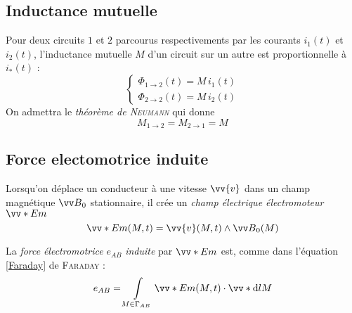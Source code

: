 \documentclass[11pt,a4paper,fleqn,pdftex]{report}
\begin{document}
\subsection{Inductance mutuelle} %
\label{sub:inductance_mutuelle}
\begin{itheorem}
  Pour deux circuits $1$ et $2$ parcourus respectivements par les courants $i_1(t)$ et $i_2(t)$, l'inductance mutuelle $M$ d'un circuit sur un autre est proportionnelle à $i_*(t)$ :
  \begin{equation}
  \left\lbrace
  \begin{gathered}
    \Phi_{1\to 2}(t) = M \,i_1(t)\\
    \Phi_{2\to 2}(t) = M \,i_2(t)
  \end{gathered}
  \right.
  \end{equation}
  On admettra le \emph{théorème de \textsc{Neumann}} qui donne
  \begin{equation}
  M_{1\to 2} = M_{2\to 1} = M
  \end{equation}
  
\end{itheorem}
\subsection{Force electomotrice induite} %
\label{sub:force_electomotrice_induite}
\begin{dfn}
   Lorsqu'on déplace un conducteur à une vitesse $\vv{v}$ dans un champ magnétique $\B{}_0$ stationnaire, il crée un \emph{champ électrique électromoteur} $\vv*{E}{m}$
   \begin{equation}
   \vv*{E}{m}(M,t) = \vv{v}(M,t) \wedge \B{}_0(M)
   \end{equation}
\end{dfn}
\begin{theorem}
   La \emph{force} \emph{électromotrice} $e_{AB}$ \emph{induite} par $\vv*{E}{m}$ est, comme dans l'équation \eqref{Faraday} de \textsc{Faraday} : 
   \begin{equation}
   e_{AB} = \int \limits_{M\in \Gamma_{AB}} \vv*{E}{m}(M,t) \cdot \vv*{\d l}{M}
   \end{equation}
\end{theorem}
\end{document}
